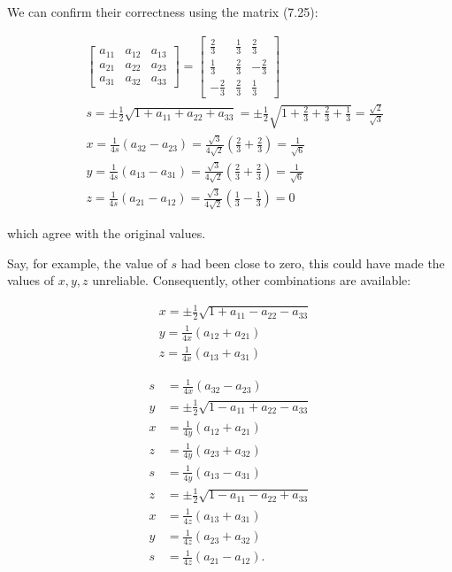 We can confirm their correctness using the matrix (7.25):

$$
\begin{aligned}
& \left[\begin{array}{lll}a_{11} & a_{12} & a_{13} \\a_{21} & a_{22} & a_{23} \\a_{31} & a_{32} & a_{33}\end{array}\right]=\left[\begin{array}{ccc}\frac{2}{3} & \frac{1}{3} & \frac{2}{3} \\\frac{1}{3} & \frac{2}{3} & -\frac{2}{3} \\-\frac{2}{3} & \frac{2}{3} & \frac{1}{3}\end{array}\right] \\
& s=\pm \frac{1}{2} \sqrt{1+a_{11}+a_{22}+a_{33}}=\pm \frac{1}{2} \sqrt{1+\frac{2}{3}+\frac{2}{3}+\frac{1}{3}}=\frac{\sqrt{2}}{\sqrt{3}} \\
& x=\frac{1}{4 s}\left(a_{32}-a_{23}\right)=\frac{\sqrt{3}}{4 \sqrt{2}}\left(\frac{2}{3}+\frac{2}{3}\right)=\frac{1}{\sqrt{6}} \\
& y=\frac{1}{4 s}\left(a_{13}-a_{31}\right)=\frac{\sqrt{3}}{4 \sqrt{2}}\left(\frac{2}{3}+\frac{2}{3}\right)=\frac{1}{\sqrt{6}} \\
& z=\frac{1}{4 s}\left(a_{21}-a_{12}\right)=\frac{\sqrt{3}}{4 \sqrt{2}}\left(\frac{1}{3}-\frac{1}{3}\right)=0
\end{aligned}
$$

which agree with the original values.

Say, for example, the value of $s$ had been close to zero, this could have made the values of $x, y, z$ unreliable. Consequently, other combinations are available:

$$
\begin{aligned}
& x=\pm \frac{1}{2} \sqrt{1+a_{11}-a_{22}-a_{33}} \\
& y=\frac{1}{4 x}\left(a_{12}+a_{21}\right) \\
& z=\frac{1}{4 x}\left(a_{13}+a_{31}\right)
\end{aligned}
$$

$$
\begin{aligned}
s & =\frac{1}{4 x}\left(a_{32}-a_{23}\right) \\
y & =\pm \frac{1}{2} \sqrt{1-a_{11}+a_{22}-a_{33}} \\
x & =\frac{1}{4 y}\left(a_{12}+a_{21}\right) \\
z & =\frac{1}{4 y}\left(a_{23}+a_{32}\right) \\
s & =\frac{1}{4 y}\left(a_{13}-a_{31}\right) \\
z & =\pm \frac{1}{2} \sqrt{1-a_{11}-a_{22}+a_{33}} \\
x & =\frac{1}{4 z}\left(a_{13}+a_{31}\right) \\
y & =\frac{1}{4 z}\left(a_{23}+a_{32}\right) \\
s & =\frac{1}{4 z}\left(a_{21}-a_{12}\right) .
\end{aligned}
$$

